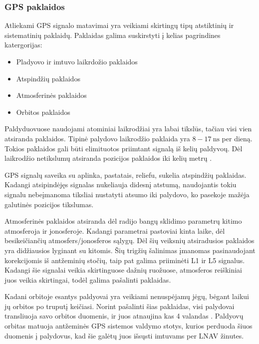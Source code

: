 \documentclass[main.tex]{subfiles}
\begin{document}
\subsubsection {GPS paklaidos}

Atliekami GPS signalo matavimai yra veikiami skirtingų tipų atstiktinių ir sistematinių
paklaidų. Paklaidas galima suskirstyti į kelias pagrindines katergorijas\cite{KUMAR20213_chapter1}:

\begin{itemize}
    \item Pladyovo ir imtuvo laikrdožio paklaidos
    \item Atspindžių paklaidos
    \item Atmosferinės paklaidos
    \item Orbitos paklaidos
\end{itemize}

Paldyduovuose naudojami atominiai laikrodžiai yra labai tikslūs, tačiau visi vien atsiranda paklaidos.
Tipinė palydovo laikrodžio paklaida yra $8-17\ \mathrm{ns}$ per dieną. Tokios paklaidos
gali būti elimituotos priimtant signalą iš kelių paldyvoų. Dėl laikrodžio netikslumų atsiranda
pozicijos paklaidos iki kelių metrų \cite{KUMAR20213_chapter1}.

GPS signalų saveika su aplinka, pastatais, reliefu, sukelia atspindžių paklaidas. Kadangi
atsipindėjęs signalas nukeliauja didesnį atstumą, naudojantis tokiu signalu nebeįmanoma
tiksliai nustatyti atsumo iki palydovo, ko pasekoje mažėja galutinės pozicijos tikslumas.

Atmosferinės paklaidos atsiranda dėl radijo bangų sklidimo parametrų kitimo atmosferoja ir
jonosferoje. Kadangi parametrai pastoviai kinta laike, dėl besikeičiančių atmosfers/jonosferos
sąlygų. Dėl šių veiksnių atsiradusios paklaidos yra didžiausios lyginant su kitomis.
Šių trigžių šalinimas įmanomas pasinaudojant korekcijomis iš antžeminių stočių, taip
pat galima priiminėti L1 ir L5 signalus. Kadangi šie signalai veikia skirtinguose
dažnių ruožuose, atmosferos reiškiniai juos veikia skirtingai, todėl galima pašalinti
paklaidas.

Kadani orbitoje esantys paldyovai yra veikiami nenuspėjamų jėgų, bėgant laikui jų orbitos
po truputį keičiasi. Norint pašalinti šias paklaidas, visi palydovai transliuoja savo
orbitos duomenis, ir juos atnaujina kas 4 valandas \cite{sps_standard}. Paldyovų orbitas
matuoja antžeminės GPS sistemos valdymo stotys, kurios perduoda šiuos duomenis
į palydovus, kad šie galėtų juos išsųsti imtuvams per LNAV žinutes.
\end{document}

